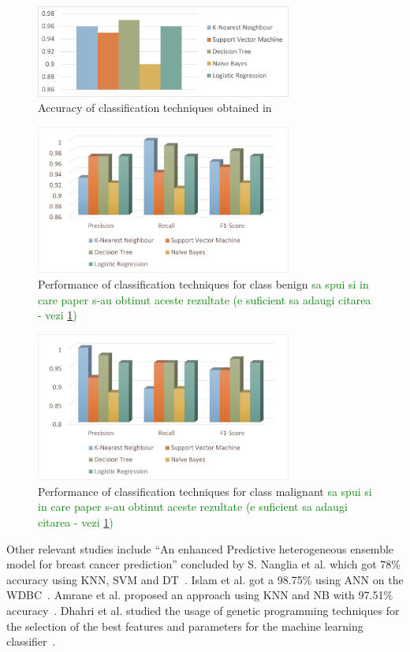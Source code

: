 \begin{figure}[h!]
    \centering
    \includegraphics[width=0.75\textwidth]{figures/Figure1.jpg}
    \caption{Accuracy of classification techniques obtained in ~\cite{carte2}}
    \label{fig:fig1}
\end{figure}
\begin{figure}[h!]
    \centering
    \includegraphics[width=0.75\textwidth]{figures/Figure2.jpg}
    \caption{Performance of classification techniques for class benign
    \textcolor{green}{sa spui si in care paper s-au obtinut aceste rezultate (e suficient sa adaugi citarea - vezi \ref{fig:fig1})}
    }
    \label{fig:fig2}
\end{figure}
\begin{figure}[h!]
    \centering
    \includegraphics[width=0.75\textwidth]{figures/Figure3.jpg}
    \caption{Performance of classification techniques for class malignant
    \textcolor{green}{sa spui si in care paper s-au obtinut aceste rezultate (e suficient sa adaugi citarea - vezi \ref{fig:fig1})}
    }
    \label{fig:fig3}
\end{figure}

Other relevant studies include “An enhanced Predictive heterogeneous ensemble model for breast cancer prediction” concluded by S. Nanglia et al. which got 78\% accuracy using KNN, SVM and DT~\cite{carte1}. Islam et al. got a 98.75\% using ANN on the WDBC~\cite{carte3}. Amrane et al. proposed an approach using KNN and NB with 97.51\% accuracy~\cite{carte4}. Dhahri et al. studied the usage of genetic programming techniques for the selection of the best features and parameters for the machine learning classifier~\cite{carte5}.